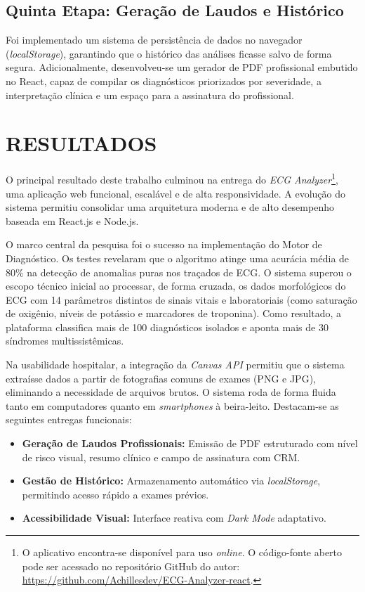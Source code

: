 \documentclass[portuguese,12pt,oneside,a4paper]{book}
\begin{document}
\section{Quinta Etapa: Geração de Laudos e Histórico}
Foi implementado um sistema de persistência de dados no navegador (\textit{localStorage}), garantindo que o histórico das análises ficasse salvo de forma segura. Adicionalmente, desenvolveu-se um gerador de PDF profissional embutido no React, capaz de compilar os diagnósticos priorizados por severidade, a interpretação clínica e um espaço para a assinatura do profissional.

\chapter{RESULTADOS}

O principal resultado deste trabalho culminou na entrega do \textit{ECG Analyzer}\footnote{O aplicativo encontra-se disponível para uso \textit{online}. O código-fonte aberto pode ser acessado no repositório GitHub do autor: \url{https://github.com/Achillesdev/ECG-Analyzer-react}.}, uma aplicação web funcional, escalável e de alta responsividade. A evolução do sistema permitiu consolidar uma arquitetura moderna e de alto desempenho baseada em React.js e Node.js.

O marco central da pesquisa foi o sucesso na implementação do Motor de Diagnóstico. Os testes revelaram que o algoritmo atinge uma acurácia média de 80\% na detecção de anomalias puras nos traçados de ECG. O sistema superou o escopo técnico inicial ao processar, de forma cruzada, os dados morfológicos do ECG com 14 parâmetros distintos de sinais vitais e laboratoriais (como saturação de oxigênio, níveis de potássio e marcadores de troponina). Como resultado, a plataforma classifica mais de 100 diagnósticos isolados e aponta mais de 30 síndromes multissistêmicas.

Na usabilidade hospitalar, a integração da \textit{Canvas API} permitiu que o sistema extraísse dados a partir de fotografias comuns de exames (PNG e JPG), eliminando a necessidade de arquivos brutos. O sistema roda de forma fluida tanto em computadores quanto em \textit{smartphones} à beira-leito. Destacam-se as seguintes entregas funcionais:
\begin{itemize}
    \item \textbf{Geração de Laudos Profissionais:} Emissão de PDF estruturado com nível de risco visual, resumo clínico e campo de assinatura com CRM.
    \item \textbf{Gestão de Histórico:} Armazenamento automático via \textit{localStorage}, permitindo acesso rápido a exames prévios.
    \item \textbf{Acessibilidade Visual:} Interface reativa com \textit{Dark Mode} adaptativo.
\end{itemize}
\end{document}
